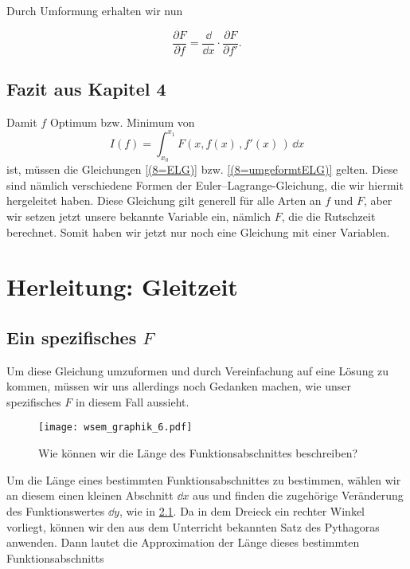 Durch Umformung erhalten wir nun

\begin{equation}\label{(8=umgeformtELG)}
 \frac{\partial F}{\partial f}
 = \frac{\dd}{\dd x} \cdot \frac{\partial F}{\partial f'}.
\end{equation}

\section{Fazit aus Kapitel 4}
Damit $f$ Optimum bzw. Minimum von 
$$I(f)= \int_{x_0}^{x_1} F(x,f(x)\,, f'(x)\,) \,\dd x $$
ist, müssen die Gleichungen \ref{(8=ELG)} bzw. \ref{(8=umgeformtELG)} gelten.
Diese sind nämlich verschiedene Formen der Euler--Lagrange-Gleichung, die wir hiermit hergeleitet haben.
Diese Gleichung gilt generell für alle Arten an $f$ und $F$, aber wir setzen jetzt unsere bekannte Variable ein, nämlich $F$, die die Rutschzeit berechnet.
Somit haben wir jetzt nur noch eine Gleichung mit einer Variablen.

\chapter{Herleitung: Gleitzeit}\label{ch5}

\section{Ein spezifisches $F$} \label{F in the chat}

Um diese Gleichung umzuformen und durch Vereinfachung auf eine Lösung zu kommen, müssen wir uns allerdings noch Gedanken machen, wie unser spezifisches $F$ in diesem Fall aussieht.


\begin{figure}[h]
 \centering
 \texttt{[image: wsem\_graphik\_6.pdf]} 
 \caption[Steigungsdreieck. TikZ - eigene Arbeit.]{Wie können wir die Länge des Funktionsabschnittes beschreiben?}
 \label{fig:d.x,d.y} 
\end{figure}

Um die Länge eines bestimmten Funktionsabschnittes zu bestimmen, wählen wir an diesem einen kleinen Abschnitt $\dd x$ aus und finden die zugehörige Veränderung des Funktionswertes $\dd y$, wie in \ref{fig:d.x,d.y}.
Da in dem Dreieck ein rechter Winkel vorliegt, können wir den aus dem Unterricht bekannten Satz des Pythagoras anwenden.
Dann lautet die Approximation der Länge dieses bestimmten Funktionsabschnitts

